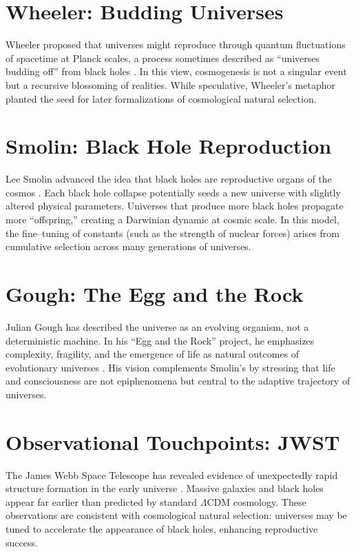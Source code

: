 \documentclass[a4paper,11pt,openany]{book}
\begin{document}
\section{Wheeler: Budding Universes}

Wheeler proposed that universes might reproduce through quantum fluctuations of spacetime 
at Planck scales, a process sometimes described as “universes budding off” from black holes 
\citep{wheeler1977genesis}. In this view, cosmogenesis is not a singular event but a 
recursive blossoming of realities. While speculative, Wheeler’s metaphor planted the seed 
for later formalizations of cosmological natural selection.

\section{Smolin: Black Hole Reproduction}

Lee Smolin advanced the idea that black holes are reproductive organs of the cosmos 
\citep{smolin1997cosmos}. Each black hole collapse potentially seeds a new universe with 
slightly altered physical parameters. Universes that produce more black holes propagate 
more “offspring,” creating a Darwinian dynamic at cosmic scale. In this model, the 
fine–tuning of constants (such as the strength of nuclear forces) arises from cumulative 
selection across many generations of universes.

\section{Gough: The Egg and the Rock}

Julian Gough has described the universe as an evolving organism, not a deterministic 
machine. In his “Egg and the Rock” project, he emphasizes complexity, fragility, and the 
emergence of life as natural outcomes of evolutionary universes \citep{gough2024egg}. His 
vision complements Smolin’s by stressing that life and consciousness are not epiphenomena 
but central to the adaptive trajectory of universes.

\section{Observational Touchpoints: JWST}

The James Webb Space Telescope has revealed evidence of unexpectedly rapid structure 
formation in the early universe \citep{jwst2023early}. Massive galaxies and black holes 
appear far earlier than predicted by standard $\Lambda$CDM cosmology. These observations 
are consistent with cosmological natural selection: universes may be tuned to accelerate 
the appearance of black holes, enhancing reproductive success.
\end{document}
